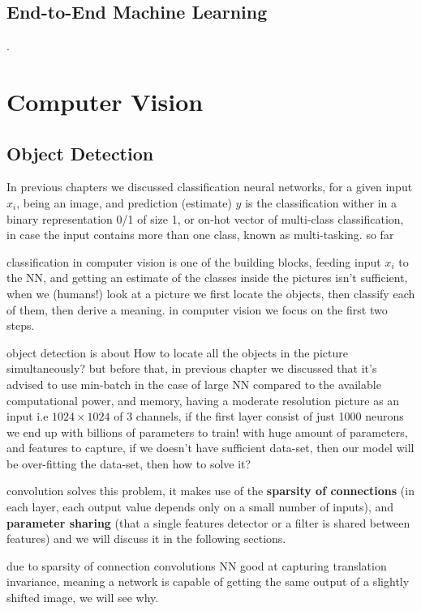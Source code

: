 \documentclass[4apaper,12pt]{book}
\begin{document}
  \section{End-to-End Machine Learning}
  \begin{description}
  \item .
  \end{description}

  \chapter{Computer Vision}
  \section {Object Detection}
  \begin{description}
  \item In previous chapters we discussed classification neural networks, for a given input $x_i$, being an image, and prediction (estimate) $y$ is the classification wither in a binary representation 0/1 of size 1, or on-hot vector of multi-class classification, in case the input contains more than one class, known as multi-tasking. so far
  \item classification in computer vision is one of the building blocks, feeding input $x_i$ to the NN, and getting an estimate of the classes inside the pictures isn't sufficient, when we (humans!) look at a picture we first locate the objects, then classify each of them, then derive a meaning. in computer vision we focus on the first two steps.
  \item object detection is about How to locate all the objects in the picture simultaneously? but before that, in previous chapter we discussed that it's advised to use min-batch in the case of large NN compared to the available computational power, and memory, having a moderate resolution picture as an input i.e $1024 \times 1024$ of 3 channels, if the first layer consist of just 1000 neurons we end up with billions of parameters to train! with huge amount of parameters, and features to capture, if we doesn't have sufficient data-set, then our model will be over-fitting the data-set, then how to solve it?
  \item convolution solves this problem, it makes use of the \textbf{sparsity of connections} (in each layer, each output value depends only on a small number of inputs), and \textbf{parameter sharing} (that a single features detector or a filter is shared between features) and we will discuss it in the following sections.
 \item due to sparsity of connection convolutions NN good at capturing translation invariance, meaning a network is capable of getting the same output of a slightly shifted image, we will see why.

\end{description}
\end{document}
